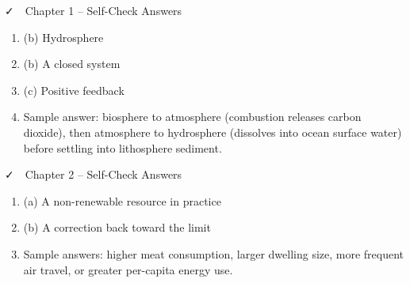 \documentclass[11pt,a4paper]{scrreprt}
\begin{document}
\begin{infobox}{\faCheck\ \ Chapter 1 -- Self-Check Answers}
\begin{enumerate}[label=\arabic*.]
  \item (b) Hydrosphere
  \item (b) A closed system
  \item (c) Positive feedback
  \item Sample answer: biosphere to atmosphere (combustion releases carbon dioxide), then
    atmosphere to hydrosphere (dissolves into ocean surface water) before settling into
    lithosphere sediment.
\end{enumerate}
\end{infobox}

\vspace{10pt}

\begin{infobox}{\faCheck\ \ Chapter 2 -- Self-Check Answers}
\begin{enumerate}[label=\arabic*.]
  \item (a) A non-renewable resource in practice
  \item (b) A correction back toward the limit
  \item Sample answers: higher meat consumption, larger dwelling size, more frequent air travel,
    or greater per-capita energy use.
\end{enumerate}
\end{infobox}

\vspace{16pt}
\end{document}
